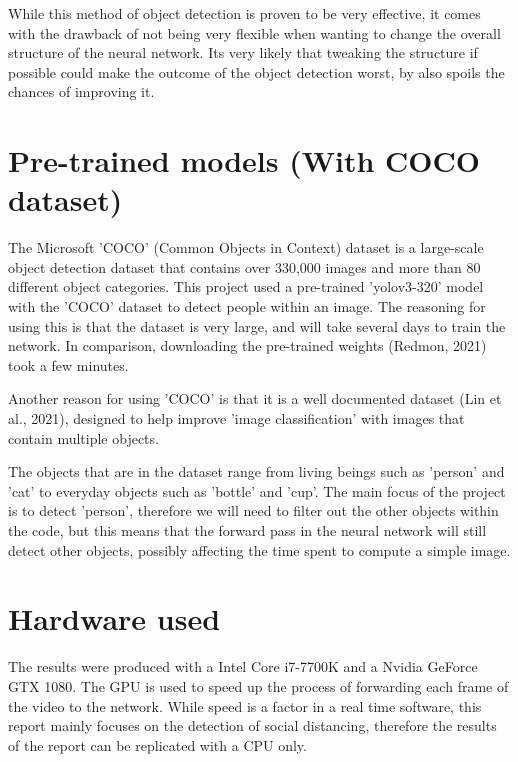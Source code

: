 \documentclass[12pt]{report}
\begin{document}
\vspace{2mm}

While this method of object detection is proven to be very effective, it comes with the drawback of not being very flexible when wanting to change the overall structure of the neural network. Its very likely that tweaking the structure if possible could make the outcome of the object detection worst, by also spoils the chances of improving it.

\section{Pre-trained models (With COCO dataset)}

The Microsoft 'COCO' (Common Objects in Context) dataset is a large-scale object detection dataset that contains over 330,000 images and more than 80 different object categories. This project used a pre-trained 'yolov3-320' model with the 'COCO' dataset to detect people within an image. The reasoning for using this is that the dataset is very large, and will take several days to train the network. In comparison, downloading the pre-trained weights (Redmon, 2021) took a few minutes. 

\vspace{2mm}

Another reason for using 'COCO' is that it is a well documented dataset (Lin et al., 2021), designed to help improve 'image classification' with images that contain multiple objects.

\vspace{2mm}

The objects that are in the dataset range from living beings such as 'person' and 'cat' to everyday objects such as 'bottle' and 'cup'. The main focus of the project is to detect 'person', therefore we will need to filter out the other objects within the code, but this means that the forward pass in the neural network will still detect other objects, possibly affecting the time spent to compute a simple image. 

\section{Hardware used}

The results were produced with a Intel Core i7-7700K and a Nvidia GeForce GTX 1080. The GPU is used to speed up the process of forwarding each frame of the video to the network. While speed is a factor in a real time software, this report mainly focuses on the detection of social distancing, therefore the results of the report can be replicated with a CPU only.
\end{document}
